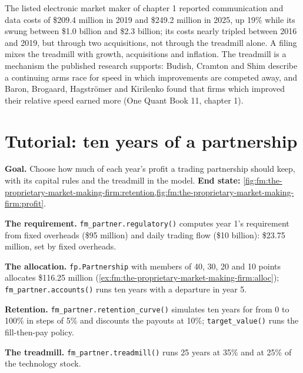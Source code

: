 \begin{remark}\label{rem:fm:the-proprietary-market-making-firm:filings}
The listed electronic market maker of chapter 1 reported communication and data costs of \$209.4 million in 2019 and \$249.2 million in 2025, up
19\% while its  swung between \$1.0 billion and \$2.3 billion; its costs nearly tripled between 2016 and 2019, but through two
acquisitions, not through the treadmill alone. A filing mixes the treadmill with growth, acquisitions and inflation. The treadmill is a mechanism
the published research supports: Budish, Cramton and Shim describe a continuing arms race for speed in which improvements are competed away, and
Baron, Brogaard, Hagströmer and Kirilenko found that firms which improved their relative speed earned more (One Quant Book 11, chapter 1).
\end{remark}

\section{Tutorial: ten years of a partnership}\label{tut:fm:the-proprietary-market-making-firm:tut}

\begin{tutorial}
\textbf{Goal.} Choose how much of each year's profit a trading partnership should keep, with its capital rules and the treadmill in the model.
\textbf{End state:} \cref{fig:fm:the-proprietary-market-making-firm:retention,fig:fm:the-proprietary-market-making-firm:profit}.
\begin{tutsteps}
\item \textbf{The requirement.} \texttt{fm\_partner.regulatory()} computes year 1's  requirement from fixed overheads (\$95 million) and
daily trading flow (\$10 billion): \$23.75 million, set by fixed overheads.
\item \textbf{The allocation.} \texttt{fp.Partnership} with members of 40, 30, 20 and 10 points allocates \$116.25 million
(\cref{ex:fm:the-proprietary-market-making-firm:alloc}); \texttt{fm\_partner.accounts()} runs ten years with a departure in year 5.
\item \textbf{Retention.} \texttt{fm\_partner.retention\_curve()} simulates ten years for  from 0 to 100\% in steps of 5\% and
discounts the payouts at 10\%; \texttt{target\_value()} runs the fill-then-pay policy.
\item \textbf{The treadmill.} \texttt{fm\_partner.treadmill()} runs 25 years at 35\% and at 25\% of the technology stock.
\end{tutsteps}
\end{tutorial}

